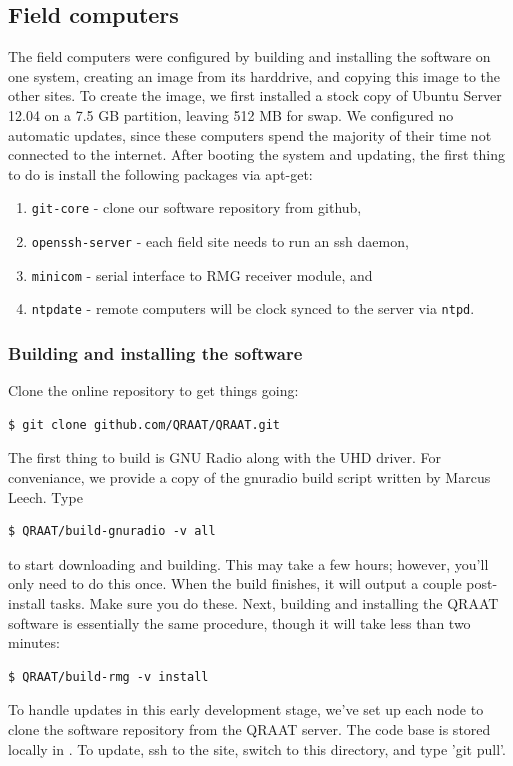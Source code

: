\documentclass[letter]{article}
\begin{document}
\subsection{Field computers}
The field computers were configured by building and installing the software on one 
system, creating an image from its harddrive, and copying this image to the other sites. To create
the image, we first installed a stock copy of Ubuntu Server 12.04 on a 7.5 GB partition, leaving
512 MB for swap. We configured no automatic updates, since these computers spend the majority of 
their time not connected to the internet. After booting the system and updating, the first thing
to do is install the following packages via apt-get: 
\begin{enumerate}
  \item \texttt{git-core} - clone our software repository from github,
  \item \texttt{openssh-server} - each field site needs to run an ssh daemon,
  \item \texttt{minicom} - serial interface to RMG receiver module, and
  \item \texttt{ntpdate} - remote computers will be clock synced to the server via \texttt{ntpd}. 
\end{enumerate}

\subsubsection{Building and installing the software}
Clone the online repository to get things going:
\begin{verbatim}
$ git clone github.com/QRAAT/QRAAT.git
\end{verbatim}
The first thing to build is GNU Radio along with the UHD driver. For conveniance, we provide a copy 
of the gnuradio build script written by Marcus Leech. Type
\begin{verbatim}
$ QRAAT/build-gnuradio -v all
\end{verbatim}
to start downloading and building. This may take a few hours; however, you'll only need to do this once. When the 
build finishes, it will output a couple post-install tasks. Make sure you do these. Next, building
and installing the QRAAT software is essentially the same procedure, though it will take less than 
two minutes: 
\begin{verbatim}
$ QRAAT/build-rmg -v install
\end{verbatim}

To handle updates in this early development stage, we've set up each node to clone 
the software repository from the QRAAT server. The code base is stored locally in
. To update, ssh to the site, switch to this directory, and type
'git pull'.
\end{document}
